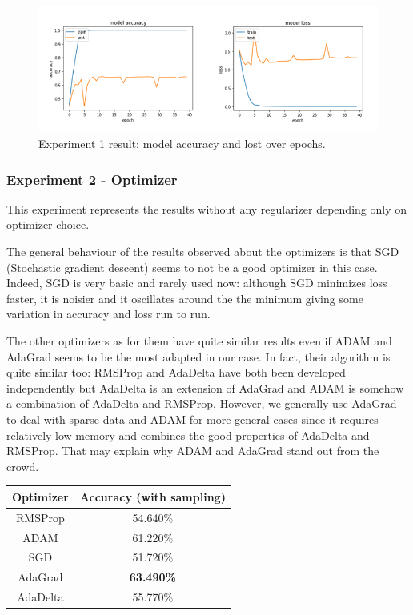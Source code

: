 \documentclass[11pt, openany]{report}
\theoremstyle{plain}
\theoremstyle{definition}
\theoremstyle{remark}
\begin{document}
\begin{figure}[H]
  \centering
  \includegraphics[scale=0.6]{Code/ch5-ModelPrototype/figures_result/40epochs_sample_withoutoptimisation.PNG}
  \caption{Experiment 1 result: model accuracy and lost over epochs.}
  \label{fig:cifar_epoch_res}
\end{figure}
 
\subsubsection{Experiment 2 - Optimizer} 

This experiment represents the results without any regularizer depending only on optimizer choice.

The general behaviour of the results observed about the optimizers is that SGD (Stochastic gradient descent) seems to not be a good optimizer in this case. Indeed, SGD is very basic and rarely used now: although SGD minimizes loss faster, it is noisier and it oscillates around the the minimum giving some variation in accuracy and loss run to run.

The other optimizers as for them have quite similar results even if ADAM and AdaGrad seems to be the most adapted in our case. In fact, their algorithm is quite similar too: RMSProp and AdaDelta have both been developed independently but AdaDelta is an extension of AdaGrad and ADAM is somehow a combination of AdaDelta and RMSProp. However, we generally use AdaGrad to deal with sparse data and ADAM for more general cases since it requires relatively low memory and combines the good properties of AdaDelta and RMSProp. That may explain why ADAM and AdaGrad stand out from the crowd. 

\begin{center}
\begin{tabular}{|c|c|}
  \hline
  Optimizer & Accuracy (with sampling) \\
  \hline
  RMSProp & 54.640\% \\
  ADAM  & 61.220\% \\
  SGD & 51.720\% \\
  AdaGrad & \textbf{63.490\%} \\
  AdaDelta & 55.770\% \\
  \hline
\end{tabular}
\end{center}
\end{document}
